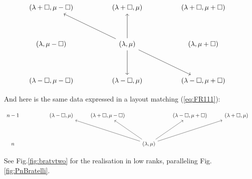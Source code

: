\documentclass[reqno,10pt,a4paper]{amsart}
\newcommand{\blue}[1]{\textcolor{blue}{#1}}
\newcommand{\red}[1]{\textcolor{red}{#1}}
\newcommand{\ppm}[1]{\red{#1}}
\newcommand{\ca}[1]{\blue{#1}}
\begin{document}
{\small
\begin{equation}
     \label{eq:resschem}
\begin{tikzcd}
	{(\lambda+\square, \mu-\square) } && {(\lambda+\square,\mu) } && {(\lambda+\square,\mu+\square) } \\
	\\
	{(\lambda,\mu-\square) } && {(\lambda,\mu)} && {(\lambda,\mu+\square) } \\
	\\
	{(\lambda-\square,\mu-\square) } && {(\lambda-\square,\mu) } && {(\lambda-\square,\mu+\square) }
	\arrow[from=3-3, to=1-1]
	\arrow[from=3-3, to=1-3]
	\arrow[from=3-3, to=5-3]
	\arrow[from=3-3, to=5-5]
\end{tikzcd}
\end{equation}
}

And here is the same data expressed in a layout matching (\ref{eq:FR111}):

{\small
\[\begin{tikzcd}
	{n-1} && { (\lambda-\square,\mu) } & {(\lambda+\square, \mu-\square)} && {(\lambda-\square,\mu+\square)} & {(\lambda+\square,\mu) } \\
	\\
	n &&&& {(\lambda,\mu)}
	\arrow[from=3-5, to=1-3]
	\arrow[from=3-5, to=1-4]
	\arrow[from=3-5, to=1-6]
	\arrow[from=3-5, to=1-7]
\end{tikzcd}\]
}


\noindent
See Fig.\ref{fig:bratvtwo} for the realisation in low ranks, paralleling Fig.\ref{fig:PnBratelli}. 



\end{document}
